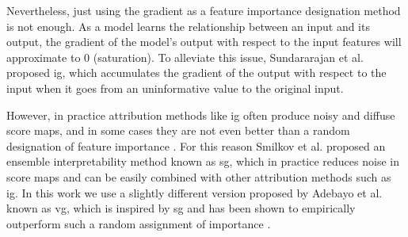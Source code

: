 Nevertheless, just using the gradient as a feature importance designation method is not enough. As a model learns the relationship between an input and its output, the gradient of the model's output with respect to the input features will approximate to 0 (saturation).
To alleviate this issue, Sundararajan et al. \cite{sundararajan2017axiomatic} proposed \gls{ig}, which accumulates the gradient of the output with respect to the input when it goes from an uninformative value to the original input.

However, in practice attribution methods like \gls{ig} often produce noisy and diffuse score maps, and in some cases they are not even better than a random designation of feature importance \cite{hooker2018benchmark}.
For this reason Smilkov et al. \cite{Smilkov_smoothgrad} proposed an ensemble interpretability method known as \gls{sg}, which in practice reduces noise in score maps and can be easily combined with other attribution methods such as  \gls{ig}.
In this work we use a slightly different version proposed by Adebayo et al. \cite{adebayo2018local} known as \gls{vg}, which is inspired by \gls{sg} and has been shown to empirically outperform such a random assignment of importance \cite{hooker2018benchmark}.
